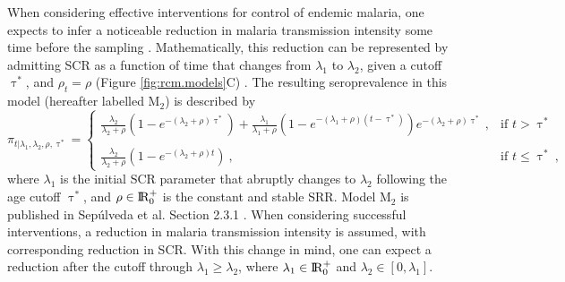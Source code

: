 When considering effective interventions for control of endemic malaria, one expects to infer a noticeable reduction in malaria transmission intensity some time before the sampling \cite{cook2010using}.
Mathematically, this reduction can be represented by admitting SCR as a function of time that changes from $\lambda_1$ to $\lambda_2$, given a cutoff $\uptau^*$, and $\rho_t=\rho$ (Figure \ref{fig:rcm.models}C) \cite{sepulveda2015current}.
The resulting seroprevalence in this model (hereafter labelled $\text{M}_{2}$) is described  by
%
\begin{equation}
    \label{eq:rcm.reduction.scr}
    \pi_{t| \lambda_1, \lambda_2, \rho, \uptau^*} = \left\{\begin{array}{ll} \frac{\lambda_{2}}{\lambda_{2}+\rho}\left(1-e^{-(\lambda_{2}+\rho)\uptau^{*}}\right)+\frac{\lambda_{1}}{\lambda_{1}+\rho}\left(1-e^{-(\lambda_{1}+\rho)(t-\uptau^*)}\right)e^{-(\lambda_{2}+\rho)\uptau^{*}}\ , & \text{if $t>\uptau^{*}$} \\\\  \frac{\lambda_{2}}{\lambda_{2}+\rho}\left(1-e^{-(\lambda_{2}+\rho)t} \right)\ , & \text{if $t\le\uptau^{*}$}\ , \end{array}\right.
\end{equation}
%
\noindent
where $\lambda_1$ is the initial SCR parameter that abruptly changes to $\lambda_2$ following the age cutoff $\uptau^*$, and $\rho \in \rm I\!R_{0}^{+}$ is the constant and stable SRR.
Model M$_2$ is published in Sepúlveda et al. Section 2.3.1 \cite{sepulveda2015current}.
When considering successful interventions, a reduction in malaria transmission intensity is assumed, with corresponding reduction in SCR.
With this change in mind, one can expect a reduction after the cutoff through $\lambda_1\geq\lambda_2$, where $\lambda_1 \in \rm I\!R_{0}^{+}$ and $\lambda_2 \in [0,\lambda_1]$.

